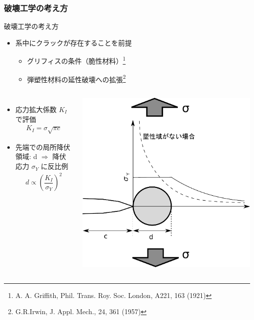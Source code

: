 \documentclass[aspectratio=169,11pt, dvipdfmx]{beamer}
\begin{document}
\begin{frame}
    \frametitle{破壊工学の考え方}
	\vspace{-2mm}
    \begin{exampleblock}{破壊工学の考え方}
		\begin{itemize}
			\item 系中に\alert{クラックが存在することを前提}
			\begin{itemize}
				\item グリフィスの条件（脆性材料）\footnote[1]{
					A. A. Griffith, Phil. Trans. Roy. Soc. London, A221, 163 (1921)
					}
					\item 弾塑性材料の延性破壊への拡張\footnote[2]{
						G.R.Irwin, J. Appl. Mech., 24, 361 (1957)
						}
			\end{itemize}
		\end{itemize}
    \end{exampleblock}
        \begin{columns}
                \begin{itemize}
                    \item
                    応力拡大係数 $K_I$ で評価
                    \footnotesize
                    \begin{align*}
                    K_{I} = \sigma \sqrt{\pi c}
                    \end{align*}
                    \normalsize
                    \item 
                    先端での局所降伏領域: d $\Rightarrow$ 降伏応力 $\sigma_Y$ に反比例
                    \footnotesize
                    \begin{align*}
                    d \propto \left( \dfrac{K_I}{\sigma_Y} \right)^2
                    \end{align*}
                    \normalsize
                \end{itemize}
                \centering
                \includegraphics[width=.7\textwidth]{./Crack_Yield.pdf}
            \end{columns}
	
\end{frame}
\end{document}
